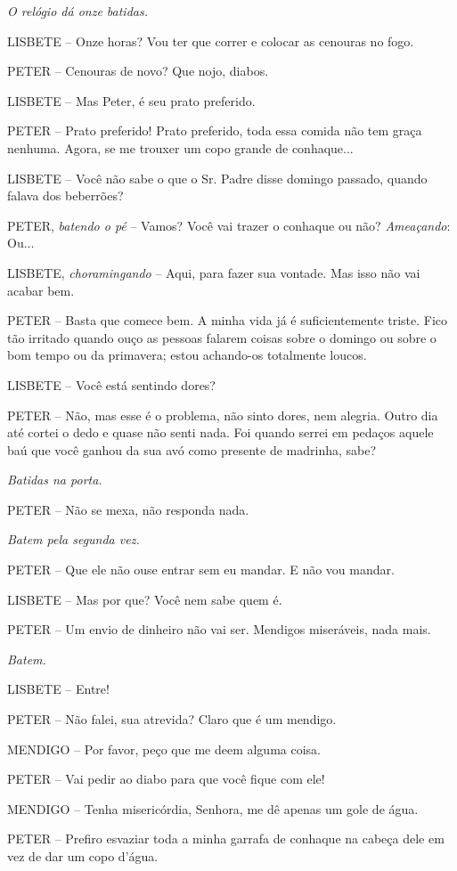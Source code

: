 \emph{O relógio dá onze batidas.}

LISBETE -- Onze horas? Vou ter que correr e colocar as cenouras no fogo.

PETER -- Cenouras de novo? Que nojo, diabos.

LISBETE -- Mas Peter, é seu prato preferido.

PETER -- Prato preferido! Prato preferido, toda essa comida não tem
graça nenhuma. Agora, se me trouxer um copo grande de conhaque...

LISBETE -- Você não sabe o que o Sr. Padre disse domingo passado, quando
falava dos beberrões?

PETER, \emph{batendo o pé} -- Vamos? Você vai trazer o conhaque ou não?
\emph{Ameaçando}: Ou...

LISBETE, \emph{choramingando} -- Aqui, para fazer sua vontade. Mas isso
não vai acabar bem.

PETER -- Basta que comece bem. A minha vida já é suficientemente triste.
Fico tão irritado quando ouço as pessoas falarem coisas sobre o domingo
ou sobre o bom tempo ou da primavera; estou achando-os totalmente
loucos.

LISBETE -- Você está sentindo dores?

PETER -- Não, mas esse é o problema, não sinto dores, nem alegria. Outro
dia até cortei o dedo e quase não senti nada. Foi quando serrei em
pedaços aquele baú que você ganhou da sua avó como presente de madrinha,
sabe?

\emph{Batidas na porta.}

PETER -- Não se mexa, não responda nada.

\emph{Batem pela segunda vez.}

PETER -- Que ele não ouse entrar sem eu mandar. E não vou mandar.

LISBETE -- Mas por que? Você nem sabe quem é.

PETER -- Um envio de dinheiro não vai ser. Mendigos miseráveis, nada
mais.

\emph{Batem.}

LISBETE -- Entre!

PETER -- Não falei, sua atrevida? Claro que é um mendigo.

MENDIGO -- Por favor, peço que me deem alguma coisa.

PETER -- Vai pedir ao diabo para que você fique com ele!

MENDIGO -- Tenha misericórdia, Senhora, me dê apenas um gole de água.

PETER -- Prefiro esvaziar toda a minha garrafa de conhaque na cabeça
dele em vez de dar um copo d'água.

